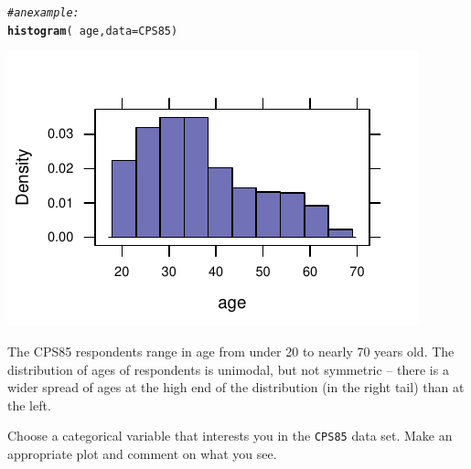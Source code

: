 \documentclass[twoside]{book}\usepackage[]{graphicx}\usepackage[]{xcolor}
\makeatletter
\def\maxwidth{ %
  \ifdim\Gin@nat@width>\linewidth
    \linewidth
  \else
    \Gin@nat@width
  \fi
}
\newcommand{\hlcom}[1]{\textcolor[rgb]{0.678,0.584,0.686}{\textit{#1}}}%
\newcommand{\hlopt}[1]{\textcolor[rgb]{0,0,0}{#1}}%
\newcommand{\hlstd}[1]{\textcolor[rgb]{0.345,0.345,0.345}{#1}}%
\newcommand{\hlkwc}[1]{\textcolor[rgb]{0.333,0.667,0.333}{#1}}%
\newcommand{\hlkwd}[1]{\textcolor[rgb]{0.737,0.353,0.396}{\textbf{#1}}}%
\newenvironment{kframe}{%
 \def\at@end@of@kframe{}%
 \ifinner\ifhmode%
  \def\at@end@of@kframe{\end{minipage}}%
  \begin{minipage}{\columnwidth}%
 \fi\fi%
 \def\FrameCommand##1{\hskip\@totalleftmargin \hskip-\fboxsep
 \colorbox{shadecolor}{##1}\hskip-\fboxsep
     \hskip-\linewidth \hskip-\@totalleftmargin \hskip\columnwidth}%
 \MakeFramed {\advance\hsize-\width
   \@totalleftmargin\z@ \linewidth\hsize
   \@setminipage}}%
 {\par\unskip\endMakeFramed%
 \at@end@of@kframe}
\newenvironment{knitrout}{}{} %
\newcommand{\Rindex}[1]{\index{\texttt{#1}}}
\newcommand{\dataframe}[1]{{\color{blue!80!black}\texttt{#1}}\Rindex{#1}}
\newcounter{example}[section]
\makeatother
\begin{document}
\begin{solution}
\begin{knitrout}
\color{fgcolor}\begin{kframe}
\begin{alltt}
\hlcom{# an example:}
\hlkwd{histogram}\hlstd{(}\hlopt{~}\hlstd{age,} \hlkwc{data} \hlstd{= CPS85)}
\end{alltt}
\end{kframe}

{\centering \includegraphics[width=\maxwidth]{figures/fig-unnamed-chunk-22-1} 

}



\end{knitrout}
The CPS85 respondents range in age from under 20 to nearly 70 years old.  The distribution of ages of respondents is unimodal, but not symmetric -- there is a wider spread of ages at the high end of the distribution (in the right tail) than at the left. 
\end{solution}

\begin{problem}
	Choose a categorical variable that interests you in the \dataframe{CPS85}
	data set.  Make an appropriate plot and comment on what you see.
\end{problem}
\end{document}
